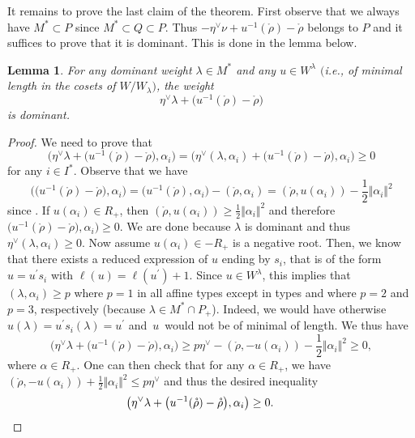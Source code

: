 \documentclass[10pt,a4paper]{amsart}
\newtheorem{Lemma}[Theorem]{Lemma}
\numberwithin{equation}{section}
\begin{document}
It remains to prove the last claim of the theorem. First observe that we
always have $M^{\ast}\subset P$ since $M^{\ast}\subset Q\subset P$. Thus
$-\eta^{\vee}\nu+u^{-1}(\mathring{\rho})-\mathring{\rho}$ belongs to $P$ and
it suffices to prove that it is dominant. This is done in the lemma below.

\begin{Lemma}
	For any dominant weight $\lambda\in M^{\ast}$ and any $u\in W^{\lambda}$
	$($i.e., of minimal length in the cosets of $W/W_{\lambda})$, the weight
	\[
	\eta^{\vee}\lambda+\bigl(u^{-1}(\mathring{\rho})-\mathring{\rho}\bigr)
	\]
	is dominant.
\end{Lemma}

\begin{proof}
	We need to prove that
	\[
	\bigl(\eta^{\vee}\lambda+\bigl(u^{-1}(\mathring{\rho})-\mathring{\rho}\bigr),\alpha_{i}%
	\bigr)=\bigl(\eta^{\vee}(\lambda,\alpha_{i})+\bigl(u^{-1}(\mathring{\rho})-\mathring{\rho
	}\bigr), \alpha_{i}\bigr)\geq0
	\]
	for any $i\in I^{\ast}$. Observe that we have
	\[
	\bigl(\bigl(u^{-1}(\mathring{\rho})-\mathring{\rho}\bigr), \alpha_{i}\bigr) =\bigl(u^{-1}(\mathring{\rho
	}),\alpha_{i}\bigr)-(\mathring{\rho},\alpha_{i})=(\mathring{\rho},u(\alpha
	_{i}))-\frac{1}{2} \Vert \alpha_{i} \Vert ^{2}
	\]
	since . If $u(\alpha_{i})\in R_{+}$, then $(\mathring{\rho
	},u(\alpha_{i}))\geq\frac{1}{2} \Vert \alpha_{i} \Vert ^{2}$ and
	therefore $\bigl(u^{-1}(\mathring{\rho})-\mathring{\rho}\bigr),\alpha_{i})\geq0$. We are
	done because $\lambda$ is dominant and thus $\eta^{\vee}(\lambda,\alpha
	_{i})\geq0$. Now assume $u(\alpha_{i})\in-R_{+}$ is a negative root. Then, we
	know that there exists a reduced expression of $u$ ending by $s_{i}$, that is
	of the form $u=u^{\prime}s_{i}$ with $\ell(u)=\ell(u^{\prime})+1$. Since $u\in
	W^{\lambda}$, this implies that $(\lambda,\alpha_{i})\geq p$ where $p=1$ in
	all affine types except in types  and  where $p=2$
	and $p=3$, respectively (because $\lambda\in M^{\ast}\cap P_{+}$). Indeed, we
	would have otherwise $u(\lambda)=u^{\prime}s_{i}(\lambda)=u^{\prime}$ and~$u$~would
    not be of minimal of length. We thus have
	\[
	\bigl(\eta^{\vee}\lambda+\bigl(u^{-1}(\mathring{\rho})-\mathring{\rho}\bigr),\alpha_{i}\bigr)\geq
	p\eta^{\vee}-(\mathring{\rho},-u(\alpha_{i}))-\frac{1}{2} \Vert \alpha
	_{i} \Vert ^{2}\geq0,
	\]
	where $\alpha\in R_{+}$. One can then check that for any $\alpha\in R_{+}$,
	we have $(\mathring{\rho},-u(\alpha_{i}))+\frac{1}{2} \Vert \alpha
	_{i} \Vert ^{2}\leq p\eta^{\vee}$ and thus the desired inequality
	\[
	\bigl(\eta^{\vee}\lambda+\bigl(u^{-1}(\mathring{\rho})-\mathring{\rho}\bigr),\alpha_{i}%
	\bigr)\geq0.\qedhere
\tag*{\qed}
\]
\renewcommand{\qed}{}
\end{proof}
\end{document}
